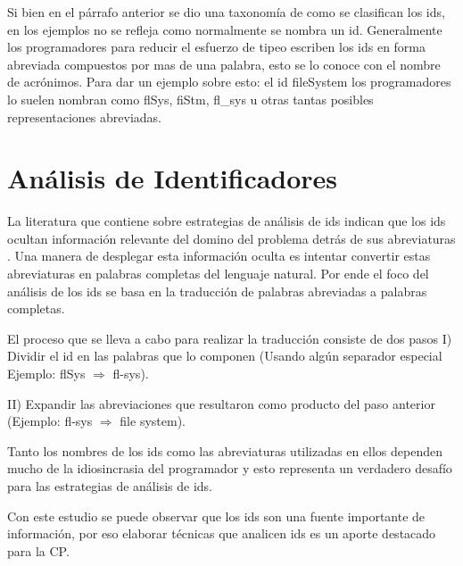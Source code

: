\documentclass[12pt]{report}
\begin{document}
Si bien en el párrafo anterior se dio una taxonomía de como se clasifican los ids, en los ejemplos no se refleja como normalmente se nombra un id.
Generalmente los programadores para reducir el esfuerzo de tipeo escriben los ids en forma abreviada compuestos por mas de una palabra, esto se lo conoce con el nombre de acrónimos. Para dar un ejemplo sobre esto: el id \textsf{fileSystem} los programadores lo suelen nombran como \textsf{flSys}, \textsf{fiStm}, \textsf{fl\_sys} u otras tantas posibles representaciones abreviadas.



\section{Análisis de Identificadores}

La literatura que contiene sobre estrategias de análisis de ids indican que los ids ocultan información relevante del domino del problema detrás de sus abreviaturas \cite{EHPV09,LFBEX07}. Una manera de desplegar esta información oculta es intentar convertir estas abreviaturas en palabras completas del lenguaje natural. Por ende el foco del análisis de los ids se basa en la traducción de palabras abreviadas a palabras completas.

El proceso que se lleva a cabo para realizar la traducción consiste de dos pasos I) Dividir el id en las palabras que lo componen (Usando algún separador especial Ejemplo: \textsf{flSys} $\Rightarrow$ \textsf{fl-sys}).

II) Expandir las abreviaciones que resultaron como producto del paso anterior (Ejemplo: \textsf{fl-sys} $\Rightarrow$ \textsf{file system}).

Tanto los nombres de los ids como las abreviaturas utilizadas en ellos dependen mucho de la idiosincrasia del programador y esto representa un verdadero desafío para las estrategias de análisis de ids.

Con este estudio se puede observar que los ids son una fuente importante de información, por eso elaborar técnicas que analicen ids es un aporte destacado para la CP.

\end{document}
